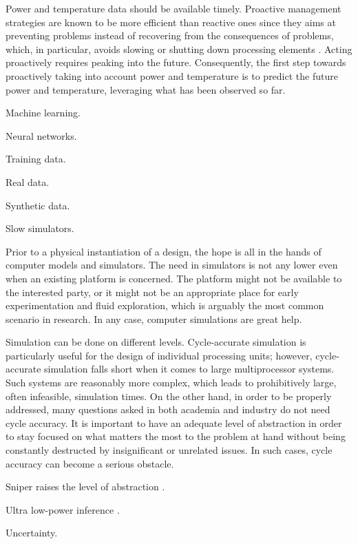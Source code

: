 Power and temperature data should be available timely. Proactive management
strategies are known to be more efficient than reactive ones since they aims at
preventing problems instead of recovering from the consequences of problems,
which, in particular, avoids slowing or shutting down processing elements
\cite{coskun2008}. Acting proactively requires peaking into the future.
Consequently, the first step towards proactively taking into account power and
temperature is to predict the future power and temperature, leveraging what has
been observed so far.

Machine learning.

Neural networks.

Training data.

Real data.

Synthetic data.

Slow simulators.

Prior to a physical instantiation of a design, the hope is all in the hands of
computer models and simulators. The need in simulators is not any lower even
when an existing platform is concerned. The platform might not be available to
the interested party, or it might not be an appropriate place for early
experimentation and fluid exploration, which is arguably the most common
scenario in research. In any case, computer simulations are great help.

Simulation can be done on different levels. Cycle-accurate simulation is
particularly useful for the design of individual processing units; however,
cycle-accurate simulation falls short when it comes to large multiprocessor
systems. Such systems are reasonably more complex, which leads to prohibitively
large, often infeasible, simulation times. On the other hand, in order to be
properly addressed, many questions asked in both academia and industry do not
need cycle accuracy. It is important to have an adequate level of abstraction in
order to stay focused on what matters the most to the problem at hand without
being constantly destructed by insignificant or unrelated issues. In such cases,
cycle accuracy can become a serious obstacle.

Sniper raises the level of abstraction \cite{carlson2011}.

Ultra low-power inference \cite{park2015}.

Uncertainty.
